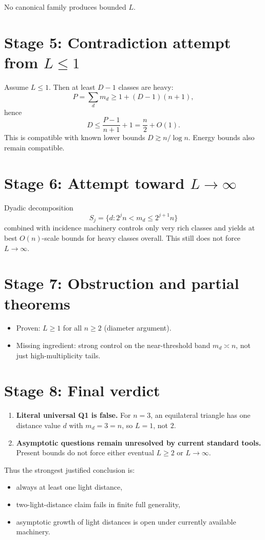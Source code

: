 \documentclass[11pt]{article}
\begin{document}
No canonical family produces bounded \(L\).

\section*{Stage 5: Contradiction attempt from \(L\le 1\)}

Assume \(L\le 1\). Then at least \(D-1\) classes are heavy:
\[
P=\sum_d m_d \ge 1 + (D-1)(n+1),
\]
hence
\[
D \le \frac{P-1}{n+1}+1 = \frac n2 + O(1).
\]
This is compatible with known lower bounds \(D\gtrsim n/\log n\). Energy bounds also remain compatible.

\section*{Stage 6: Attempt toward \(L\to\infty\)}

Dyadic decomposition
\[
S_j=\{d:2^jn < m_d \le 2^{j+1}n\}
\]
combined with incidence machinery controls only very rich classes and yields at best \(O(n)\)-scale bounds for heavy classes overall. This still does not force \(L\to\infty\).

\section*{Stage 7: Obstruction and partial theorems}

\begin{itemize}
  \item Proven: \(L\ge 1\) for all \(n\ge 2\) (diameter argument).
  \item Missing ingredient: strong control on the near-threshold band \(m_d\asymp n\), not just high-multiplicity tails.
\end{itemize}

\section*{Stage 8: Final verdict}

\begin{enumerate}
  \item \textbf{Literal universal Q1 is false.} For \(n=3\), an equilateral triangle has one distance value \(d\) with \(m_d=3=n\), so \(L=1\), not \(2\).
  \item \textbf{Asymptotic questions remain unresolved by current standard tools.} Present bounds do not force either eventual \(L\ge 2\) or \(L\to\infty\).
\end{enumerate}

Thus the strongest justified conclusion is:
\begin{itemize}
  \item always at least one light distance,
  \item two-light-distance claim fails in finite full generality,
  \item asymptotic growth of light distances is open under currently available machinery.
\end{itemize}
\end{document}

